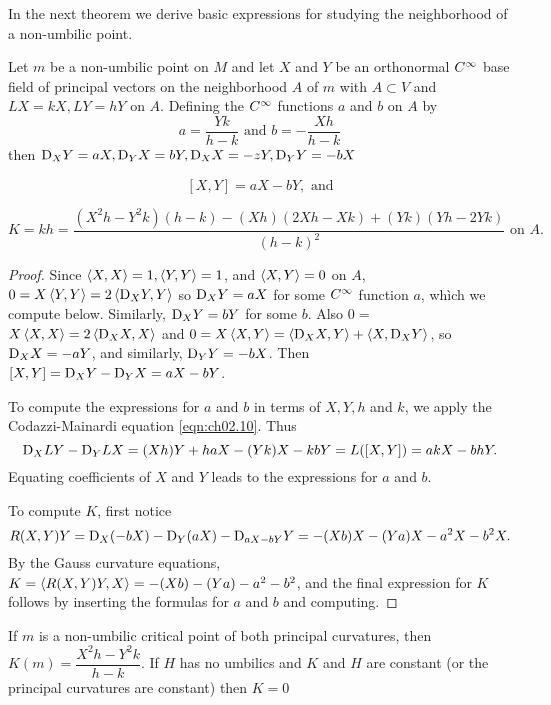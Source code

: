 \documentclass[../main]{subfiles}
\begin{document}
In the next theorem we derive basic expressions for studying the neighborhood of a non-umbilic point.



\begin{theorem} \label{thm:ch3.1.2}
 
Let $m$ be a non-umbilic point on $M$ and let $X$ and $Y$ be an orthonormal $C^\infty$ base field of principal vectors on the neighborhood $A$ of $m$ with $A \subset V$ and $L X=k X, L Y=h Y$ on $A$. Defining the $C^\infty$ functions $a$ and $b$ on $A$ by
\[
a=\dfrac{Y k}{h-k} \text { and }  b=-\dfrac{X h}{h-k}
\]
then $\mathrm{D}_{X} Y=a X, \mathrm{D}_{Y} X=b Y, \mathrm{D}_{X} X=-z Y, \mathrm{D}_{Y} Y=-b X$

    

\[[X, Y]=a X-b Y, \text{ and}\]

\[K=k h=\frac{\left(X^{2} h-Y^{2} k\right)(h-k)-(X h)(2 X h-X k)+(Y k)(Y h-2 Y k)}{(h-k)^{2}}\text{ on } A.\]

\end{theorem} 

\begin{proof}

Since $\left\langle X, X\right\rangle=1,\left\langle Y, Y\right\rangle=1$, and $\left\langle X, Y\right\rangle=0$ on $A$, \newline $0= X\left\langle Y,Y\right\rangle=2\left\langle\mathrm{D}_{X} Y,Y\right\rangle$ so $\mathrm{D}_{X} Y=a X$ for some $C^\infty$ function $a$, whìch we compute below. Similarly, $\mathrm{D}_{X} Y=b Y$ for some $b$. Also \newline $0=$ $X\left\langle X, X\right\rangle=2\left\langle \mathrm{D}_{X} X, X\right\rangle$ and $0=X\left\langle X, Y\right\rangle=\left\langle \mathrm{D}_{X} X, Y\right\rangle+\left\langle X, \mathrm{D}_{X} Y\right\rangle$, so $\mathrm{D}_{X} X=-a Y$, and similarly, $\mathrm{D}_{Y} Y=-b X$. Then $[X, Y]=\mathrm{D}_{X} Y-\mathrm{D}_{Y} X= a X-b Y$.

To compute the expressions for $a$ and $b$ in terms of $X, Y, h$ and $k$, we apply the Codazzi-Mainardi equation \ref{eqn:ch02.10}. Thus \[\mathrm{D}_{X} L Y-\mathrm{D}_{Y} L X=(X h) Y+h a X-(Y k) X-k b Y=L([X, Y])=a k X-b h Y.\] Equating coefficients of $X$ and $Y$ leads to the expressions for $a$ and $b$.

To compute $K$, first notice \[R(X, Y) Y=\mathrm{D}_{X}(-b X)-\mathrm{D}_{Y}(a X)-\mathrm{D}_{a X-b Y} Y=-(X b) X-(Y a) X-a^{2} X-b^{2} X .\] By the Gauss curvature equations, $K=\left\langle R(X, Y) Y,X\right\rangle=-(X b)-(Y a)-a^{2}-b^{2}$, and the final expression for $K$ follows by inserting the formulas for $a$ and $b$ and computing.

\end{proof}



\begin{corollary} \label{cor:ch3.1.3}

If $m$ is a non-umbilic critical point of both principal curvatures, then $K(m)=\dfrac{X^{2} h-Y^{2} k}{ h-k}$. If $H$ has no umbilics and $K$ and $H$ are constant (or the principal curvatures are constant) then $K=0$
\end{corollary} 
\end{document}
